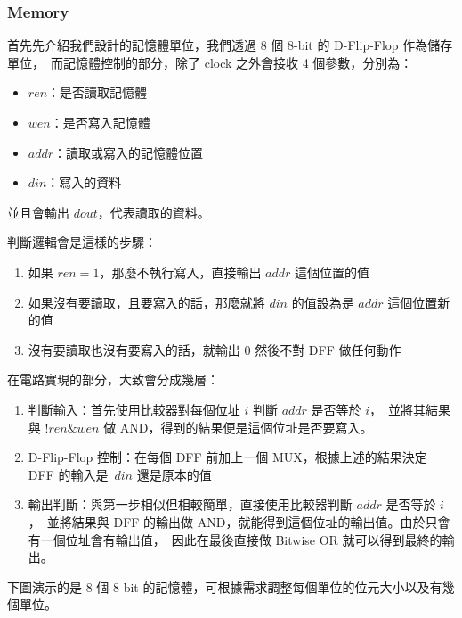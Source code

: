 \documentclass[10.5pt,compsoc,UTF8]{CjC}
\theoremstyle{mystyle}
\begin{document}
\subsubsection*{Memory}
首先先介紹我們設計的記憶體單位，我們透過 8 個 8-bit 的 D-Flip-Flop 作為儲存單位，\ 
而記憶體控制的部分，除了 clock 之外會接收 4 個參數，分別為：
\begin{itemize}
  \item $ren$：是否讀取記憶體
  \item $wen$：是否寫入記憶體
  \item $addr$：讀取或寫入的記憶體位置
  \item $din$：寫入的資料
\end{itemize}
並且會輸出 $dout$，代表讀取的資料。
\par
判斷邏輯會是這樣的步驟：
\begin{enumerate}
  \item 如果 $ren = 1$，那麼不執行寫入，直接輸出 $addr$ 這個位置的值
  \item 如果沒有要讀取，且要寫入的話，那麼就將 $din$ 的值設為是 $addr$ 這個位置新的值
  \item 沒有要讀取也沒有要寫入的話，就輸出 $0$ 然後不對 DFF 做任何動作
\end{enumerate}

在電路實現的部分，大致會分成幾層：
\begin{enumerate}
  \item 判斷輸入：首先使用比較器對每個位址 $i$ 判斷 $addr$ 是否等於 $i$，\
  並將其結果與 $!ren \& wen$ 做 AND，得到的結果便是這個位址是否要寫入。
  \item D-Flip-Flop 控制：在每個 DFF 前加上一個 MUX，根據上述的結果決定 DFF 的輸入是\
  $din$ 還是原本的值
  \item 輸出判斷：與第一步相似但相較簡單，直接使用比較器判斷 $addr$ 是否等於 $i$，\
  並將結果與 DFF 的輸出做 AND，就能得到這個位址的輸出值。由於只會有一個位址會有輸出值，\
  因此在最後直接做 Bitwise OR 就可以得到最終的輸出。
\end{enumerate}

下圖演示的是 8 個 8-bit 的記憶體，可根據需求調整每個單位的位元大小以及有幾個單位。
\newpage
\end{document}
